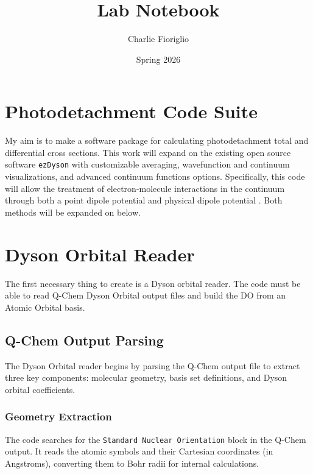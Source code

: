 \documentclass{article}
\title{Lab Notebook}
\author{Charlie Fioriglio}
\date{Spring 2026}
\begin{document}
\maketitle

\section*{Photodetachment Code Suite}
My aim is to make a software package for calculating photodetachment total and differential cross sections. This work will expand on the existing open source software \texttt{ezDyson} \cite{ezDyson_1} \cite{ezDyson_2} with customizable averaging, wavefunction and continuum visualizations, and advanced continuum functions options. Specifically, this code will allow the treatment of electron-molecule interactions in the continuum through both a point dipole potential \cite{Annie_point_dipole} and physical dipole potential \cite{Gallup_physical_dipole} \cite{Leaver_physical_dipole}. Both methods will be expanded on below.

\section{Dyson Orbital Reader}
The first necessary thing to create is a Dyson orbital reader. The code must be able to read Q-Chem Dyson Orbital output files and build the DO from an Atomic Orbital basis.

\subsection{Q-Chem Output Parsing}
The Dyson Orbital reader begins by parsing the Q-Chem output file to extract three key components: molecular geometry, basis set definitions, and Dyson orbital coefficients.

\subsubsection{Geometry Extraction}
The code searches for the \texttt{Standard Nuclear Orientation} block in the Q-Chem output. It reads the atomic symbols and their Cartesian coordinates (in Angstroms), converting them to Bohr radii for internal calculations.
\end{document}
